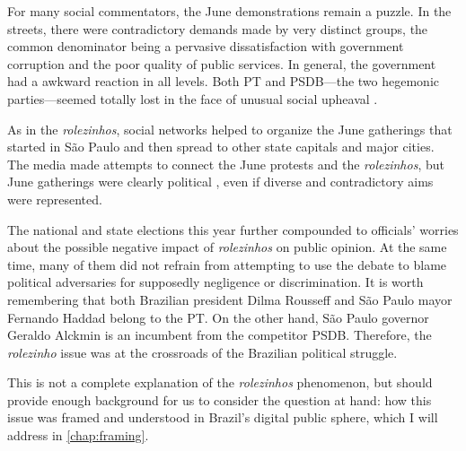 For many social commentators, the June demonstrations remain a puzzle. In the streets, there were contradictory demands made by very distinct groups, the common denominator being a pervasive dissatisfaction with government corruption and the poor quality of public services. In general, the government had a awkward reaction in all levels. Both PT and PSDB---the two hegemonic parties---seemed totally lost in the face of unusual social upheaval \autocite{campos2013drives}.

As in the \emph{rolezinhos}, social networks helped to organize the June gatherings that started in São Paulo and then spread to other state capitals and major cities. The media made attempts to connect the June protests and the \emph{rolezinhos}, but June gatherings were clearly political \autocite{gohn2014social}, even if diverse and contradictory aims were represented.

The national and state elections this year further compounded to officials' worries about the possible negative impact of \emph{rolezinhos} on public opinion. At the same time, many of them did not refrain from attempting to use the debate to blame political adversaries for supposedly negligence or discrimination. It is worth remembering that both Brazilian president Dilma Rousseff and São Paulo mayor Fernando Haddad belong to the PT. On the other hand, São Paulo governor Geraldo Alckmin is an incumbent from the competitor PSDB. Therefore, the \emph{rolezinho} issue was at the crossroads of the Brazilian political struggle.

This is not a complete explanation of the \emph{rolezinhos} phenomenon, but should provide enough background for us to consider the question at hand: how this issue was framed and understood in Brazil's digital public sphere, which I will address in \autoref{chap:framing}.